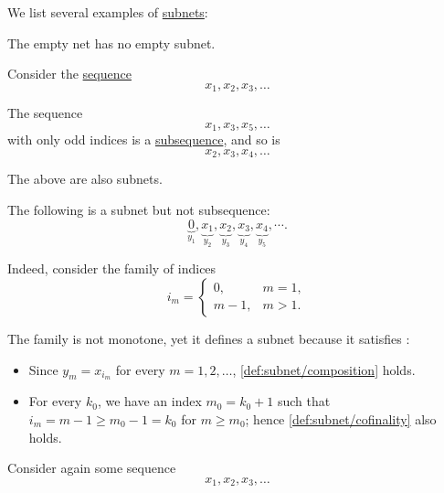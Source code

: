 \begin{example}\label{ex:def:subnet}
  We list several examples of \hyperref[def:subnet]{subnets}:
  \begin{thmenum}
     The empty net has no empty subnet.

     Consider the \hyperref[def:sequence]{sequence}
    \begin{equation*}
      x_1, x_2, x_3, \ldots
    \end{equation*}

    The sequence
    \begin{equation*}
      x_1, x_3, x_5, \ldots
    \end{equation*}
    with only odd indices is a \hyperref[def:subsequence]{subsequence}, and so is
    \begin{equation*}
      x_2, x_3, x_4, \ldots
    \end{equation*}

    The above are also subnets.

     The following is a subnet but not subsequence:
    \begin{equation*}
      \underbrace{0}_{y_1}, \underbrace{x_1}_{y_2}, \underbrace{x_2}_{y_3}, \underbrace{x_3}_{y_4}, \underbrace{x_4}_{y_5}, \cdots.
    \end{equation*}

    Indeed, consider the family of indices
    \begin{equation*}
      i_m = \begin{cases}
        0,     &m = 1, \\
        m - 1, &m > 1.
      \end{cases}
    \end{equation*}

    The family is not monotone, yet it defines a subnet because it satisfies :
    \begin{itemize}
      \item Since \( y_m = x_{i_m} \) for every \( m = 1, 2, \ldots \), \ref{def:subnet/composition} holds.
      \item For every \( k_0 \), we have an index \( m_0 = k_0 + 1 \) such that \( i_m = m - 1 \geq m_0 - 1 = k_0 \) for \( m \geq m_0 \); hence \ref{def:subnet/cofinality} also holds.
    \end{itemize}

     Consider again some sequence
    \begin{equation*}
      x_1, x_2, x_3, \ldots
    \end{equation*}


\end{thmenum}
\end{example}

